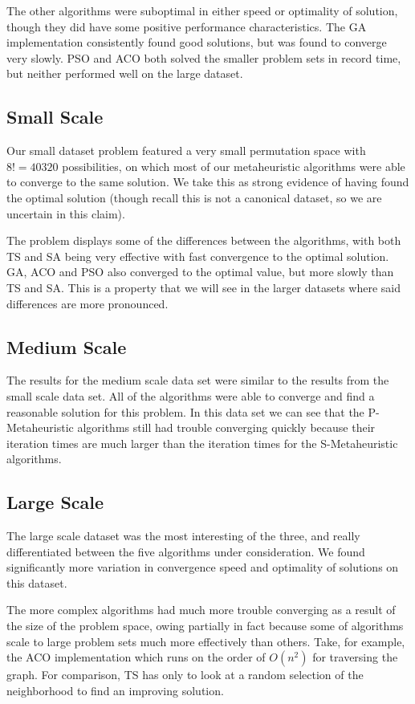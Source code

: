 \documentclass[a4paper]{article}
\begin{document}
The other algorithms were suboptimal in either speed or optimality of solution, though they did have some positive performance characteristics. The GA implementation consistently found good solutions, but was found to converge very slowly. PSO and ACO both solved the smaller problem sets in record time, but neither performed well on the large dataset. 

\subsection{Small Scale}

Our small dataset problem featured a very small permutation space with $8! = 40320$ possibilities, on which most of our metaheuristic algorithms were able to converge to the same solution. We take this as strong evidence of having found the optimal solution (though recall this is not a canonical dataset, so we are uncertain in this claim).

The problem displays some of the differences between the algorithms, with both TS and SA being very effective with fast convergence to the optimal solution. GA, ACO and PSO also converged to the optimal value, but more slowly than TS and SA. This is a property that we will see in the larger datasets where said differences are more pronounced.

\subsection{Medium Scale}

The results for the medium scale data set were similar to the results from the small scale data set. All of the algorithms were able to converge and find a reasonable solution for this problem. In this data set we can see that the P-Metaheuristic algorithms still had trouble converging quickly because their iteration times are much larger than the iteration times for the S-Metaheuristic algorithms. 

\subsection{Large Scale}

The large scale dataset was the most interesting of the three, and really differentiated between the five algorithms under consideration. We found significantly more variation in convergence speed and optimality of solutions on this dataset.

The more complex algorithms had much more trouble converging as a result of the size of the problem space, owing partially in fact because some of algorithms scale to large problem sets much more effectively than others. Take, for example, the ACO implementation which runs on the order of $O(n^2)$ for traversing the graph. For comparison, TS has only to look at a random selection of the neighborhood to find an improving solution. 
\end{document}
